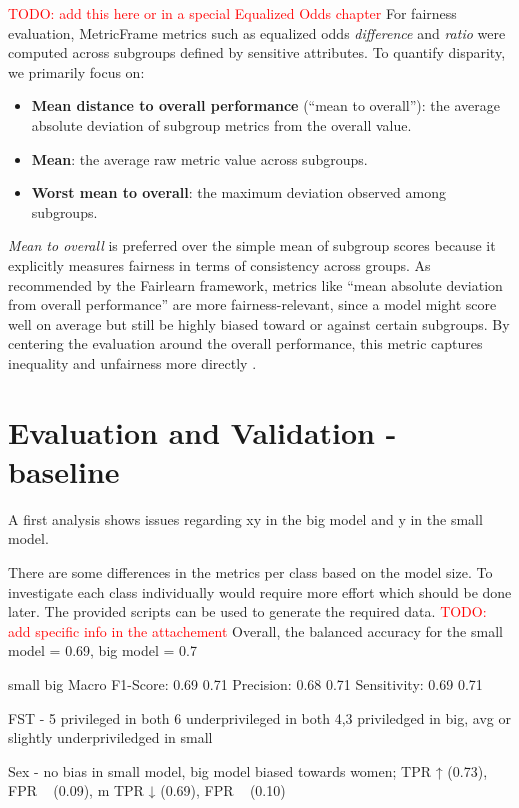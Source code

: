 \documentclass[12pt, a4paper, oneside]{book}   	%
\renewcommand{\todo}[1]{\textcolor{red}{TODO: #1}}
\begin{document}
			
			\todo{add this here or in a special Equalized Odds chapter}
			For fairness evaluation, MetricFrame metrics such as equalized odds \textit{difference} and \textit{ratio} were computed across subgroups defined by sensitive attributes.
			To quantify disparity, we primarily focus on:
			\begin{itemize}
				\item \textbf{Mean distance to overall performance} (``mean to overall''): the average absolute deviation of subgroup metrics from the overall value.
				\item \textbf{Mean}: the average raw metric value across subgroups.
				\item \textbf{Worst mean to overall}: the maximum deviation observed among subgroups.
			\end{itemize}
			
			\textit{Mean to overall} is preferred over the simple mean of subgroup scores because it explicitly measures fairness in terms of consistency across groups. As recommended by the Fairlearn framework, metrics like ``mean absolute deviation from overall performance'' are more fairness-relevant, since a model might score well on average but still be highly biased toward or against certain subgroups. By centering the evaluation around the overall performance, this metric captures inequality and unfairness more directly \cite{fairlearn}.
			
			
		\section{Evaluation and Validation - baseline}
			A first analysis shows issues regarding xy in the big model and y in the small model.
			
			There are some differences in the metrics per class based on the model size. To investigate each class individually would require more effort which should be done later. The provided scripts can be used to generate the required data. \todo{add specific info in the attachement}
			Overall, the balanced accuracy for the small model = 0.69, big model = 0.7
			
							small	big
			Macro F1-Score: 0.69	0.71
			Precision: 		0.68	0.71
			Sensitivity:	0.69	0.71
			
			FST - 5 privileged in both
			6 underprivileged in both
			4,3 priviledged in big, avg or slightly underpriviledged in small
			
			Sex - no bias in small model, big model biased towards women; TPR ↑ (0.73), FPR ~ (0.09), m TPR ↓ (0.69), FPR ~ (0.10)
			
\end{document}
